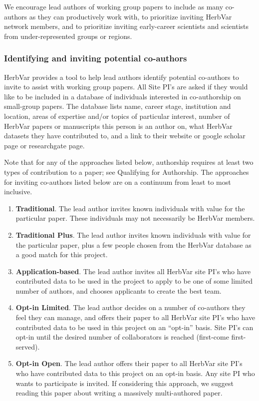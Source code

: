 \documentclass[
  letterpaper,
  oneside,
  open=any]{scrbook}
\begin{document}
We encourage lead authors of working group papers to include as many
co-authors as they can productively work with, to prioritize inviting
HerbVar network members, and to prioritize inviting early-career
scientists and scientists from under-represented groups or regions.

\subsubsection{Identifying and inviting potential
co-authors}\label{identifying-and-inviting-potential-co-authors}

HerbVar provides a tool to help lead authors identify potential
co-authors to invite to assist with working group papers. All Site PI's
are asked if they would like to be included in a database of individuals
interested in co-authorship on small-group papers. The database lists
name, career stage, institution and location, areas of expertise and/or
topics of particular interest, number of HerbVar papers or manuscripts
this person is an author on, what HerbVar datasets they have contributed
to, and a link to their website or google scholar page or researchgate
page.

Note that for any of the approaches listed below, authorship requires at
least two types of contribution to a paper; see Qualifying for
Authorship. The approaches for inviting co-authors listed below are on a
continuum from least to most inclusive.

\begin{enumerate}
\def\labelenumi{\arabic{enumi}.}
\item
  \textbf{Traditional}. The lead author invites known individuals with
  value for the particular paper. These individuals may not necessarily
  be HerbVar members.
\item
  \textbf{Traditional Plus}. The lead author invites known individuals
  with value for the particular paper, plus a few people chosen from the
  HerbVar database as a good match for this project.
\item
  \textbf{Application-based}. The lead author invites all HerbVar site
  PI's who have contributed data to be used in the project to apply to
  be one of some limited number of authors, and chooses applicants to
  create the best team.
\item
  \textbf{Opt-in Limited}. The lead author decides on a number of
  co-authors they feel they can manage, and offers their paper to all
  HerbVar site PI's who have contributed data to be used in this project
  on an ``opt-in'' basis. Site PI's can opt-in until the desired number
  of collaborators is reached (first-come first-served).
\item
  \textbf{Opt-in Open}. The lead author offers their paper to all
  HerbVar site PI's who have contributed data to this project on an
  opt-in basis. Any site PI who wants to participate is invited. If
  considering this approach, we suggest reading this paper about writing
  a massively multi-authored paper.
\end{enumerate}
\end{document}
